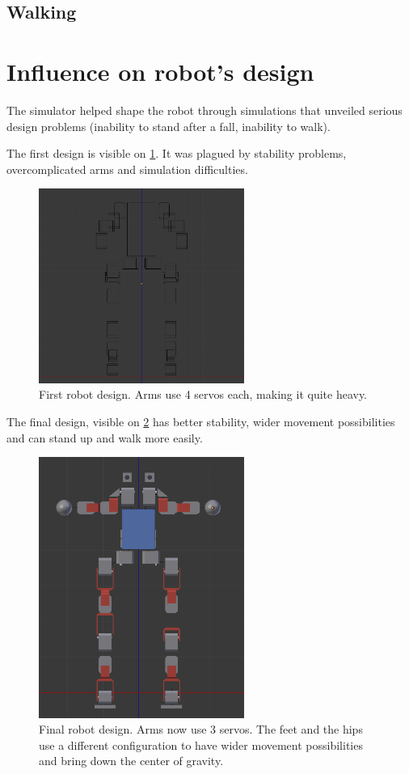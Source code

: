 \subsection{Walking}

\section{Influence on robot's design}
The simulator helped shape the robot through simulations that unveiled serious design problems (inability to stand after a fall, inability to walk).

The first design is visible on \cref{fig:first_robot}. It was plagued by stability problems, overcomplicated arms and simulation difficulties. 
\begin{figure}[htp]
\center
\includegraphics[width=0.6\textwidth]{figures/robot1}
\caption[Initial robot design]{First robot design. Arms use 4 servos each, making it quite heavy.}
\label{fig:first_robot}
\end{figure}

The final design, visible on \cref{fig:final_robot} has better stability, wider movement possibilities and can stand up and walk more easily. 
\begin{figure}[htp]
\center
\includegraphics[width=0.6\textwidth]{figures/robot2}
\caption[Final robot design]{Final robot design. Arms now use 3 servos. The feet and the hips use a different configuration to have wider movement possibilities and bring down the center of gravity.}
\label{fig:final_robot}
\end{figure}

